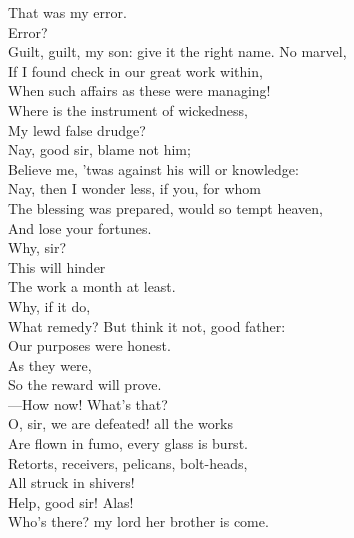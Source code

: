 \documentclass[a4paper,oneside,12pt]{memoir}
\begin{document}
\begin{drama*}
\mammonspeaks {} That was my error.\\
\subtlespeaks {} Error?\\
Guilt, guilt, my son: give it the right name. No marvel,\\
If I found check in our great work within,\\
When such affairs as these were managing!\\
Where is the instrument of wickedness,\\
My lewd false drudge?\\
\mammonspeaks {} Nay, good sir, blame not him;\\
Believe me, 'twas against his will or knowledge:\\
\subtlespeaks Nay, then I wonder less, if you, for whom\\
The blessing was prepared, would so tempt heaven,\\
And lose your fortunes.\\
\mammonspeaks {} Why, sir?\\
\subtlespeaks {} This will hinder\\
The work a month at least.\\
\mammonspeaks {} Why, if it do,\\
What remedy? But think it not, good father:\\
Our purposes were honest.\\
\subtlespeaks {} As they were,\\
So the reward will prove.\\
 ---How now! What's that?\\
\facespeaks O, sir, we are defeated! all the works\\
Are flown in fumo, every glass is burst.\\
Retorts, receivers, pelicans, bolt-heads,\\
All struck in shivers!\\
 Help, good sir! Alas!\\
Who's there? my lord her brother is come.\\

\end{drama*}
\end{document}
